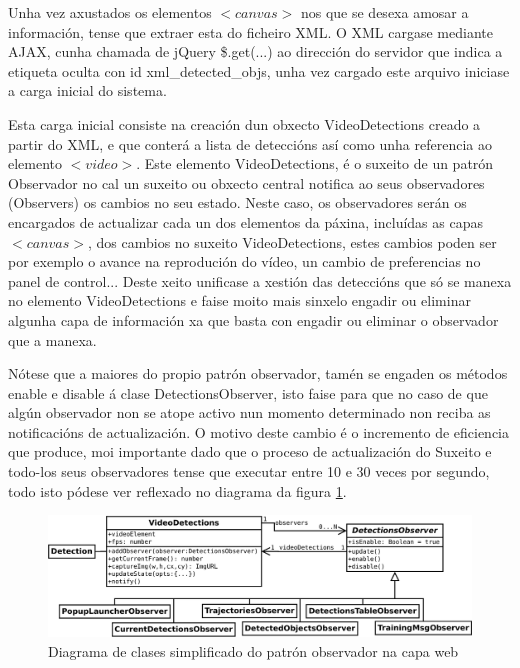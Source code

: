         Unha vez axustados os elementos $<canvas>$ nos que se desexa amosar a información, tense que 
        extraer esta do ficheiro XML. O XML cargase mediante AJAX, cunha chamada de jQuery \$.get(...) 
        ao dirección do servidor que indica a etiqueta oculta con id xml\_detected\_objs, unha vez cargado
        este arquivo iniciase a carga inicial do sistema.
        
        Esta carga inicial consiste na creación dun obxecto VideoDetections creado a partir do XML, e
        que conterá a lista de deteccións así como unha referencia ao elemento $<video>$. Este elemento
        VideoDetections, é o suxeito de un patrón Observador no cal un suxeito ou obxecto central
        notifica ao seus observadores (Observers) os cambios no seu estado. Neste caso, os observadores
        serán os encargados de actualizar cada un dos elementos da páxina, incluídas as capas $<canvas>$,
        dos cambios no suxeito VideoDetections, estes cambios poden ser por exemplo o avance na 
        reprodución do vídeo, un cambio de preferencias no panel de control... Deste xeito unificase a 
        xestión das deteccións que só se manexa no elemento VideoDetections e faise moito mais sinxelo 
        engadir ou eliminar algunha capa de información xa que basta con engadir ou eliminar o 
        observador que a manexa.
        
        Nótese que a maiores do propio patrón observador, tamén se engaden os métodos enable e disable á
        clase DetectionsObserver, isto faise para que no caso de que algún observador non se atope 
        activo nun momento determinado non reciba as notificacións de actualización. O motivo deste
        cambio é o incremento de eficiencia que produce, moi importante dado que o proceso de actualización
        do Suxeito e todo-los seus observadores tense que executar entre 10 e 30 veces por segundo, todo
        isto pódese ver reflexado no diagrama da figura \ref{fig:observerPattern}.
        
        \begin{figure}[htp]
        \begin{center}
            \includegraphics[scale=0.35]{figures/observerPattern.pdf}
            \caption{Diagrama de clases simplificado do patrón observador na capa web}
        \label{fig:observerPattern}
        \end{center}
        \end{figure}
        
